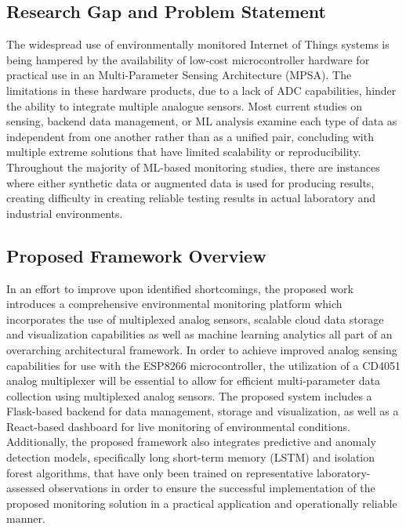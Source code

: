 ﻿\documentclass[journal]{IEEEtran}
\begin{document}
\subsection{Research Gap and Problem Statement}

The widespread use of environmentally monitored Internet of Things systems
is being hampered by the availability of low-cost microcontroller hardware
for practical use in an Multi-Parameter Sensing Architecture (MPSA). The
limitations in these hardware products, due to a lack of ADC capabilities,
hinder the ability to integrate multiple analogue sensors. Most current
studies on sensing, backend data management, or ML analysis examine each
type of data as independent from one another rather than as a unified pair,
concluding with multiple extreme solutions that have limited scalability or
reproducibility. Throughout the majority of ML-based monitoring studies,
there are instances where either synthetic data or augmented data is used
for producing results, creating difficulty in creating reliable testing
results in actual laboratory and industrial environments.

\subsection{Proposed Framework Overview}

In an effort to improve upon identified shortcomings, the proposed work
introduces a comprehensive environmental monitoring platform which
incorporates the use of multiplexed analog sensors, scalable cloud data
storage and visualization capabilities as well as machine learning
analytics all part of an overarching architectural framework. In order to
achieve improved analog sensing capabilities for use with the ESP8266
microcontroller, the utilization of a CD4051 analog multiplexer will be
essential to allow for efficient multi-parameter data collection using
multiplexed analog sensors. The proposed system includes a Flask-based
backend for data management, storage and visualization, as well as a
React-based dashboard for live monitoring of environmental conditions.
Additionally, the proposed framework also integrates predictive and
anomaly detection models, specifically long short-term memory (LSTM) and
isolation forest algorithms, that have only been trained on representative
laboratory-assessed observations in order to ensure the successful
implementation of the proposed monitoring solution in a practical
application and operationally reliable manner.
\end{document}
